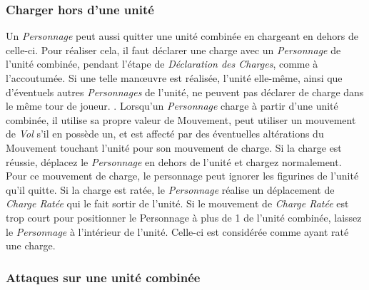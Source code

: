 \subsubsection*{Charger hors d'une unité}

Un \emph{Personnage} peut aussi quitter une unité combinée en chargeant en dehors de celle-ci. Pour réaliser cela, il faut déclarer une charge avec un \emph{Personnage} de l'unité combinée, pendant l'étape de \emph{Déclaration des Charges}, comme à l'accoutumée. Si une telle manœuvre est réalisée, l'unité elle-même, ainsi que d'éventuels autres \emph{Personnages} de l'unité, ne peuvent pas déclarer de charge dans le même tour de joueur. . Lorsqu'un \emph{Personnage} charge à partir d'une unité combinée, il utilise sa propre valeur de Mouvement, peut utiliser un mouvement de \emph{Vol} s'il en possède un, et est affecté par des éventuelles altérations du Mouvement touchant l'unité pour son mouvement de charge. Si la charge est réussie, déplacez le \emph{Personnage} en dehors de l'unité et chargez normalement. Pour ce mouvement de charge, le personnage peut ignorer les figurines de l'unité qu'il quitte. Si la charge est ratée, le \emph{Personnage} réalise un déplacement de \emph{Charge Ratée} qui le fait sortir de l'unité. Si le mouvement de \emph{Charge Ratée} est trop court pour positionner le Personnage à plus de 1{\pouce} de l'unité combinée, laissez le \emph{Personnage} à l'intérieur de l'unité. Celle-ci est considérée comme ayant raté une charge.

\subsubsection*{Attaques sur une unité combinée}

